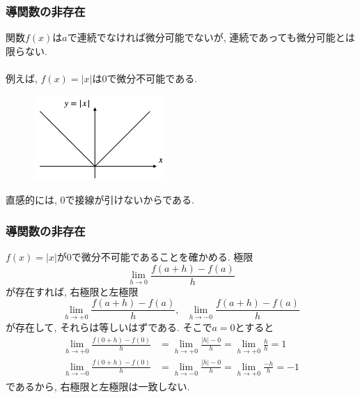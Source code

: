 \begin{frame}
\frametitle{導関数の非存在}

関数$f(x)$は$a$で連続でなければ微分可能でないが, 連続であっても微分可能とは限らない. \\
\ \\

例えば, $f(x)=|x|$は$0$で微分不可能である. 

 \begin{figure}[htbp]
 \begin{center} 
  \includegraphics[width=50mm]{calculus4/abs.png}
 \end{center}
\end{figure}

直感的には, $0$で接線が引けないからである. 

\end{frame}




\begin{frame}
\frametitle{導関数の非存在}


$f(x)=|x|$が$0$で微分不可能であることを確かめる. 
極限
$$
\lim_{h\to 0} \frac{f(a+h)-f(a)}{h}
$$
が存在すれば, 右極限と左極限
$$
\lim_{h\to +0} \frac{f(a+h)-f(a)}{h}, \ \ \ \lim_{h\to -0} \frac{f(a+h)-f(a)}{h}
$$
が存在して, それらは等しいはずである. 
そこで$a=0$とすると
\begin{align*}
\lim_{h\to +0} \frac{f(0+h)-f(0)}{h} & = 
\lim_{h\to +0} \frac{|h|-0}{h}=\lim_{h\to +0} \frac{h}{h}=1 \\
\lim_{h\to -0} \frac{f(0+h)-f(0)}{h} & = 
\lim_{h\to -0} \frac{|h|-0}{h}=\lim_{h\to +0} \frac{-h}{h}=-1
\end{align*}
であるから, 右極限と左極限は一致しない. 
\end{frame}





